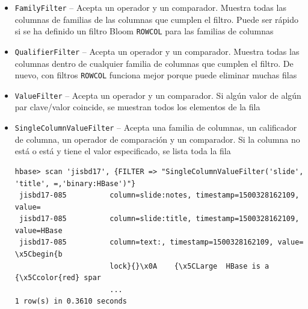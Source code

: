 \documentclass[14pt]{beamer}
\begin{document}
\begin{frame}
\begin{itemize}
\begin{frame}
\begin{itemize}
\item {\tt FamilyFilter} -- Acepta un operador y un comparador. Muestra
  todas las columnas de familias de las columnas que cumplen el filtro.
  Puede ser rápido si se ha definido un filtro Bloom {\tt ROWCOL} para las
  familias de columnas

\item {\tt QualifierFilter} -- Acepta un operador y un comparador. Muestra
  todas las columnas dentro de cualquier familia de columnas que cumplen el
  filtro. De nuevo, con filtros {\tt ROWCOL} funciona mejor porque puede
  eliminar muchas filas




\item {\tt ValueFilter} -- Acepta un operador y un comparador. Si algún
  valor de algún par clave/valor coincide, se muestran todos los elementos
  de la fila


  \framebreak

\item {\tt SingleColumnValueFilter} -- Acepta una familia de columnas, un
  calificador de columna, un operador de comparación y un comparador. Si la
  columna no está o está y tiene el valor especificado, se lista toda la
  fila

\begin{lstlisting}
hbase> scan 'jisbd17', {FILTER => "SingleColumnValueFilter('slide', 'title', =,'binary:HBase')"}
 jisbd17-085          column=slide:notes, timestamp=1500328162109, value=
 jisbd17-085          column=slide:title, timestamp=1500328162109, value=HBase
 jisbd17-085          column=text:, timestamp=1500328162109, value=  \x5Cbegin{b
                      lock}{}\x0A    {\x5CLarge  HBase is a {\x5Ccolor{red} spar
                      ...
1 row(s) in 0.3610 seconds
\end{lstlisting}


\end{itemize}
\end{frame}
\end{itemize}
\end{frame}
\end{document}
